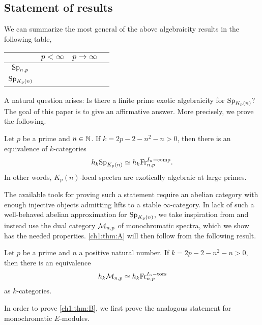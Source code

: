 \subsection*{Statement of results}

We can summarize the most general of the above algebraicity results in the following table,
\begin{table}[h]
    \centering
    \begin{tabular}{c|ccc}
        & $p<\infty $ & $p\rightarrow \infty$ \\
        \hline 
        $\mathrm{Sp}_{n,p}$& \cite{patchkoria-pstragowski_2021} & \cite{barthel-schlank-stapleton_2020} \\
        $\mathrm{Sp}_{{K_p(n)}}$ &  & \cite{barthel-schlank-stapleton_2021} 
    \end{tabular}
\end{table}

A natural question arises: Is there a finite prime exotic algebraicity for $\mathrm{Sp}_{{K_p(n)}}$? The goal of this paper is to give an affirmative answer. More precisely, we prove the following. 

\begin{introthm}
    \label{ch1:thm:A}
    Let $p$ be a prime and $n\in \mathbb{N}$. If $k=2p-2-n^2-n>0$,  then there is an equivalence of $k$-categories 
    \[h_k \mathrm{Sp}_{{K_p(n)}}\simeq h_k \mathrm{Fr}_{n,p}^{I_n-\mathrm{comp}}.\]
    In other words, $K_p(n)$-local spectra are exotically algebraic at large primes. 
\end{introthm}

The available tools for proving such a statement require an abelian category with enough injective objects admitting lifts to a stable $\infty$-category. In lack of such a well-behaved abelian approximation for $\mathrm{Sp}_{{K_p(n)}}$, we take inspiration from \cite{barthel-schlank-stapleton_2021} and instead use the dual category $\mathcal{M}_{n,p}$ of monochromatic spectra, which we show has the needed properties. \cref{ch1:thm:A} will then follow from the following result. 

\begin{introthm}
    \label{ch1:thm:B}
    Let $p$ be a prime and $n$ a positive natural number. If $k=2p-2-n^2-n>0$,  then there is an equivalence 
    \[h_k \mathcal{M}_{n,p}\simeq h_k \mathrm{Fr}_{n,p}^{I_n-\mathrm{tors}}\]
    as $k$-categories.
\end{introthm}

In order to prove \cref{ch1:thm:B}, we first prove the analogous statement for monochromatic $E$-modules. 
    
